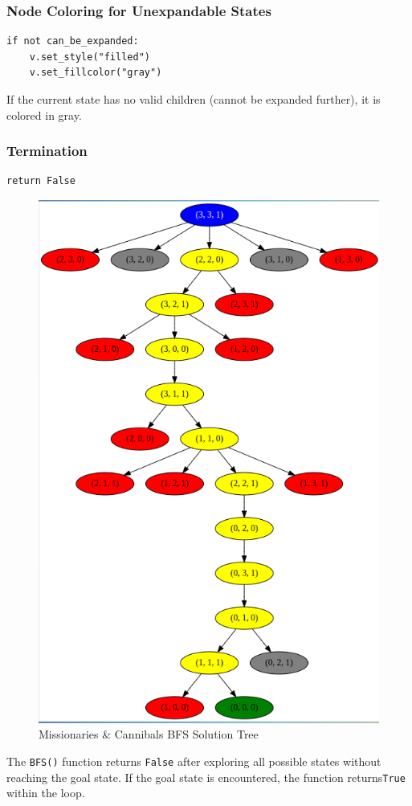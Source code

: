 \documentclass[12pt]{article}
\begin{document}
\subsubsection*{Node Coloring for Unexpandable States}
\begin{verbatim}
if not can_be_expanded:
    v.set_style("filled")
    v.set_fillcolor("gray")
\end{verbatim}
If the current state has no valid children (cannot be expanded further), it is colored in gray.
\subsubsection*{Termination}
\begin{verbatim}
return False
\end{verbatim}
\begin{figure}[h]
  \centerline{\includegraphics[width = 150mm]{MnC_BFS.png}}
  \caption{Missionaries & Cannibals BFS Solution Tree}
  \label{fig}
\end{figure}
The \texttt{BFS()} function returns \texttt{False} after exploring all possible states without reaching the goal state. If the goal state is encountered, the function returns\texttt {True} within the loop.
\clearpage
\end{document}
